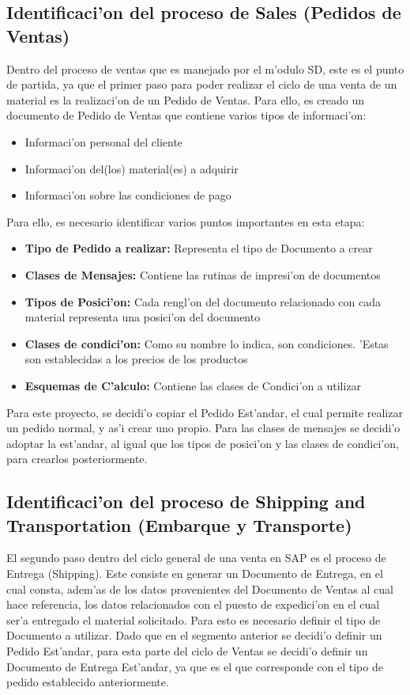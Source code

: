 \subsection{Identificaci'on del proceso de Sales (Pedidos de Ventas)}
	Dentro del proceso de ventas que es manejado por el m'odulo SD, este es el punto de partida, ya que el primer paso para poder realizar el ciclo de una venta de un material es la realizaci'on de un Pedido de Ventas. Para ello, es creado un documento de Pedido de Ventas que contiene varios tipos de informaci'on:
\begin{itemize}
\item Informaci'on personal del cliente
\item Informaci'on del(los) material(es) a adquirir
\item Informaci'on sobre las condiciones de pago
\end{itemize}
	Para ello, es necesario identificar varios puntos importantes en esta etapa:
\begin{itemize}
\item \textbf{Tipo de Pedido a realizar:} Representa el tipo de Documento a crear
\item \textbf{Clases de Mensajes:} Contiene las rutinas de impresi'on de documentos
\item \textbf{Tipos de Posici'on:} Cada rengl'on del documento relacionado con cada material representa una posici'on del documento
\item \textbf{Clases de condici'on:} Como su nombre lo indica, son condiciones. 'Estas son establecidas a los precios de los productos
\item \textbf{Esquemas de C'alculo:} Contiene las clases de Condici'on a utilizar
\end{itemize}
	Para este proyecto, se decidi'o copiar el Pedido Est'andar, el cual permite realizar un pedido normal, y as'i crear uno propio. Para las clases de mensajes se decidi'o adoptar la est'andar, al igual que los tipos de posici'on y las clases de condici'on, para crearlos posteriormente.
\subsection{Identificaci'on del proceso de Shipping and Transportation (Embarque y Transporte)}
	El segundo paso dentro del ciclo general de una venta en SAP es el proceso de Entrega (Shipping). Este consiste en generar un Documento de Entrega, en el cual consta, adem'as de los datos provenientes del Documento de Ventas al cual hace referencia, los datos relacionados con el puesto de expedici'on en el cual ser'a entregado el material solicitado. Para esto es necesario definir el tipo de Documento a utilizar. 
\newline
\newline
	Dado que en el segmento anterior se decidi'o definir un Pedido Est'andar, para esta parte del ciclo de Ventas se decidi'o definir un Documento de Entrega Est'andar, ya que es el que corresponde con el tipo de pedido establecido anteriormente.

